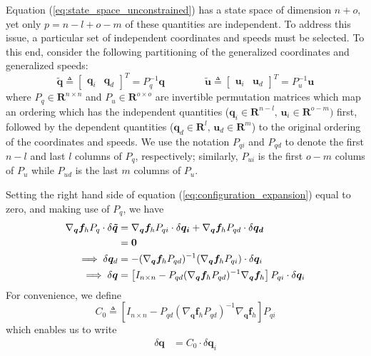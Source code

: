 \documentclass{svjour3}                     %
\begin{document}
Equation (\ref{eq:state_space_unconstrained}) has a state space of dimension $n
+ o$, yet only $p = n - l + o - m$ of these quantities are independent.
To address this issue, a particular set of independent
coordinates and speeds must be selected. To this end, consider the following
partitioning of the generalized coordinates and generalized speeds:
\begin{equation*}
  \tilde{\bm{q}} \triangleq \left[\begin{array}{cc}\bm{q}_{i} &
      \bm{q}_{d}\end{array}\right]^{T} =  P_{q}^{-1} \bm{q}
      \qquad\qquad
  \tilde{\bm{u}} \triangleq \left[\begin{array}{cc}\bm{u}_{i} &
      \bm{u}_{d}\end{array}\right]^{T} =  P_{u}^{-1} \bm{u}
\end{equation*}
where $P_q \in \mathbf{R}^{n \times n}$ and $P_u \in \mathbf{R}^{o \times o}$
are invertible permutation matrices which map an ordering which has the
independent quantities ($\bm{q}_{i}\in\mathbf{R}^{n-l},\,
\bm{u}_{i}\in\mathbf{R}^{o-m})$ first, followed by the dependent quantities
($\bm{q}_{d}\in\mathbf{R}^{l},\, \bm{u}_{d}\in\mathbf{R}^{m}$) to the
original ordering of the coordinates and speeds.  We use the notation $P_{qi}$
and $P_{qd}$ to denote the first $n-l$ and last $l$ columns of $P_q$,
respectively; similarly, $P_{ui}$ is the first $o-m$ colums of $P_{u}$ while
$P_{ud}$ is the last $m$ columns of $P_u$.

Setting the right hand side of equation (\ref{eq:configuration_expansion}) equal to
zero, and making use of $P_q$, we have
\begin{align}
  \nabla_{\bm{q}}\bm{f}_{h} P_{q} \cdot \delta \bm{\tilde{q}} &=
  \nabla_{\bm{q}}\bm{f}_{h} P_{qi} \cdot \delta \bm{q_i} +
  \nabla_{\bm{q}}\bm{f}_{h} P_{qd} \cdot \delta \bm{q_d}\notag\\
  &= \bm{0}\notag\\
  \implies \delta \bm{q}_d &= -(\nabla_{\bm{q}}\bm{f}_{h} P_{qd})^{-1}
  (\nabla_{\bm{q}}\bm{f}_{h} P_{qi}) \cdot \delta \bm{q}_i \notag\\
  \implies \delta \bm{q} &= \left[ I_{n \times n} - P_{qd}(\nabla_{\bm{q}}
    \bm{f}_{h} P_{qd})^{-1} \nabla_{\bm{q}} \bm{f}_{h} \right] P_{qi} \cdot \delta
    \bm{q}_i
\end{align}
For convenience, we define
\begin{equation}
  \label{eq:C_0}
  C_0 \triangleq \left[ I_{n \times n} - P_{qd}(\nabla_{\bm{q}}
    \bm{f}_{h} P_{qd})^{-1} \nabla_{\bm{q}} \bm{f}_{h} \right] P_{qi}
\end{equation}
which enables us to write
\begin{align}
  \label{eq:delta_q}
  \delta \bm{q} &= C_0 \cdot \delta \bm{q}_i
\end{align}
\end{document}
